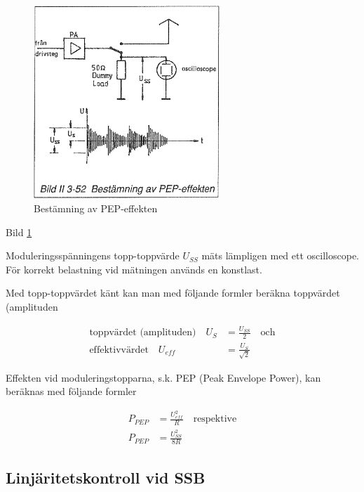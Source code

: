 \begin{figure}[h]
\begin{center}
\includegraphics[width=7cm]{images/bild_2_3-52}
\caption{Bestämning av PEP-effekten}
\label{fig:BildII3-52}
\end{center}
\end{figure}

Bild \ref{fig:BildII3-52}

Moduleringsspänningens topp-toppvärde \(U_{SS}\) mäts lämpligen med
ett oscilloscope. För korrekt belastning vid mätningen används en
konstlast.

Med topp-toppvärdet känt kan man med följande formler beräkna
toppvärdet (amplituden

\begin{align*}
  \text{toppvärdet (amplituden)} \quad
  U_S & = \frac{U_{SS}}{2}
  \quad \text{och} \\
  \text{effektivvärdet} \quad
  U_{eff} & = \frac{U_S}{\sqrt{2}}
\end{align*}

Effekten vid moduleringstopparna, s.k.  PEP (Peak Envelope Power), kan
beräknas med följande formler

\begin{align*}
  P_{PEP} &= \frac{U_{eff}^2}{R} \quad \text{respektive} \\
  P_{PEP} &= \frac{U_{SS}^2}{8R}
\end{align*}

\subsection{Linjäritetskontroll vid SSB}

